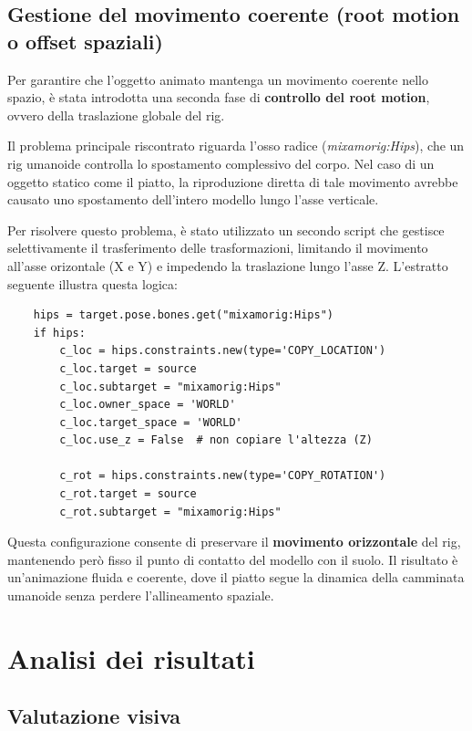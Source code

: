 \subsection{Gestione del movimento coerente (root motion o offset spaziali)}

Per garantire che l'oggetto animato mantenga un movimento coerente nello spazio, è stata introdotta una seconda fase di \textbf{controllo del root motion}, ovvero della traslazione globale del rig.

Il problema principale riscontrato riguarda l'osso radice (\textit{mixamorig:Hips}), che un rig umanoide controlla lo spostamento complessivo del corpo. Nel caso di un oggetto statico come il piatto, la riproduzione diretta di tale movimento avrebbe causato uno spostamento dell'intero modello lungo l'asse verticale.

Per risolvere questo problema, è stato utilizzato un secondo script che gestisce selettivamente il trasferimento delle trasformazioni, limitando il movimento all'asse orizontale (X e Y) e impedendo la traslazione lungo l'asse Z. L'estratto seguente illustra questa logica:

\begin{verbatim}
    hips = target.pose.bones.get("mixamorig:Hips")
    if hips:
        c_loc = hips.constraints.new(type='COPY_LOCATION')
        c_loc.target = source
        c_loc.subtarget = "mixamorig:Hips"
        c_loc.owner_space = 'WORLD'
        c_loc.target_space = 'WORLD'
        c_loc.use_z = False  # non copiare l'altezza (Z)
    
        c_rot = hips.constraints.new(type='COPY_ROTATION')
        c_rot.target = source
        c_rot.subtarget = "mixamorig:Hips"
\end{verbatim}

Questa configurazione consente di preservare il \textbf{movimento orizzontale} del rig, mantenendo però fisso il punto di contatto del modello con il suolo. Il risultato è un'animazione fluida e coerente, dove il piatto segue la dinamica della camminata umanoide senza perdere l'allineamento spaziale.

\section{Analisi dei risultati}
\subsection{Valutazione visiva}

